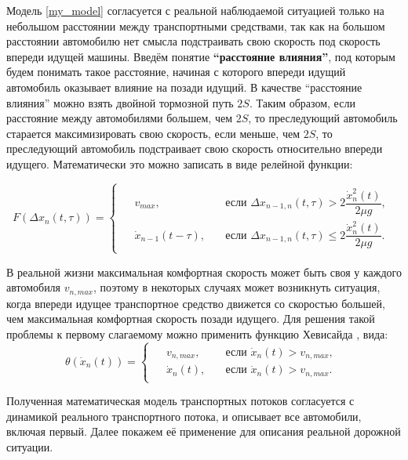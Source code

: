 \documentclass[12pt, a4paper]{extarticle}
\numberwithin{equation}{section}
\numberwithin{figure}{section}
\begin{document}
Модель \eqref{my_model} согласуется с реальной наблюдаемой ситуацией только на небольшом расстоянии между транспортными средствами, так как на большом расстоянии автомобилю нет смысла подстраивать свою скорость под скорость впереди идущей машины. Введём понятие \textbf{``расстояние влияния''}, под которым будем понимать такое расстояние, начиная с которого впереди идущий автомобиль оказывает влияние на позади идущий. В качестве ``расстояние влияния'' можно взять двойной тормозной путь $2S$. Таким образом, если расстояние между автомобилями большем, чем  $2S$, то преследующий автомобиль старается максимизировать свою скорость, если меньше, чем  $2S$, то преследующий автомобиль подстраивает свою скорость относительно впереди идущего. Математически это можно записать в виде релейной функции:

\begin{equation*}
F(\Delta x_{n}(t,\tau))=
\begin{cases}
\begin{split}
&v_{max},\quad &\text{если }\Delta x_{n-1,n}(t,\tau) > 2\dfrac{\dot{x}_n^2(t)}{2\mu g}, \\
&\dot{x}_{n-1}(t-\tau),\quad &\text{если }\Delta x_{n-1,n}(t,\tau) \leq 2\dfrac{\dot{x}_n^2(t)}{2\mu g}.
\end{split}
\end{cases}
\end{equation*}

В реальной жизни максимальная комфортная скорость может быть своя у каждого автомобиля $v_{n,max}$, поэтому в некоторых случаях может возникнуть ситуация, когда впереди идущее транспортное средство движется со скоростью большей, чем максимальная комфортная скорость позади идущего. Для решения такой проблемы к первому слагаемому можно применить функцию Хевисайда \cite{Heaviside_function}, вида:
\begin{equation*}
\theta(\dot{x}_n(t))=
\begin{cases}
\begin{split}
&v_{n,max},\quad &\text{если }\dot{x}_n(t)>v_{n,max}, \\
&\dot{x}_n(t),\quad &\text{если }\dot{x}_n(t)>v_{n,max}.
\end{split}
\end{cases}
\end{equation*}

Полученная математическая модель транспортных потоков согласуется с динамикой реального транспортного потока, и описывает все автомобили, включая первый. Далее покажем её применение для описания реальной дорожной ситуации.
\end{document}

